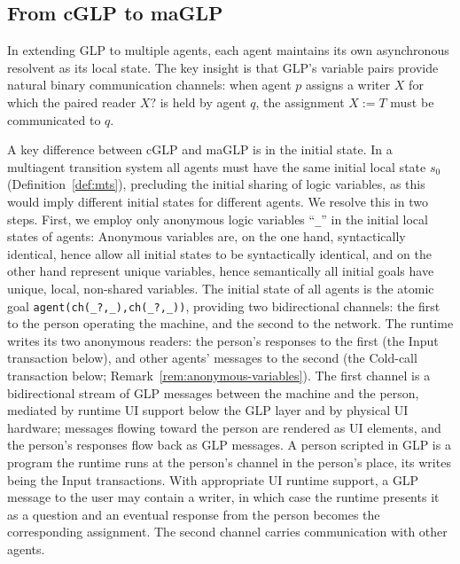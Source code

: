 \subsection{From cGLP to maGLP}
\label{sec:glp-to-maglp}\label{sec:maglp-def}

In extending GLP to multiple agents, each agent maintains its own asynchronous resolvent as its local state. The key insight is that GLP's variable pairs provide natural binary communication channels: when agent $p$ assigns a writer $X$ for which the paired reader $X?$ is held by agent $q$, the assignment $X := T$ must be communicated to $q$.

A key difference between cGLP and maGLP is in the initial state. In a multiagent transition system all agents must have the same initial local state $s_0$ (Definition~\ref{def:mts}),  precluding the initial sharing of logic variables, as this would imply different initial states for different agents.
%
We resolve this in two steps. First, we employ only anonymous logic variables ``\verb|_|'' in the initial local states of agents: Anonymous variables are, on the one hand, syntactically identical, hence allow all initial states to be syntactically identical, and on the other hand represent unique variables, hence semantically all initial goals have unique, local, non-shared variables. The initial state of all agents is the atomic goal \verb|agent(ch(_?,_),ch(_?,_))|, providing two bidirectional channels: the first to the person operating the machine, and the second to the network.  The runtime writes its two anonymous readers: the person's responses to the first (the Input transaction below), and other agents' messages to the second (the Cold-call transaction below; Remark~\ref{rem:anonymous-variables}). The first channel is a bidirectional stream of GLP messages between the machine and the person, mediated by runtime UI support below the GLP layer and by physical UI hardware; messages flowing toward the person are rendered as UI elements, and the person's responses flow back as GLP messages. A person scripted in GLP is a program the runtime runs at the person's channel in the person's place, its writes being the Input transactions. With appropriate UI runtime support, a GLP message to the user may contain a writer, in which case the runtime presents it as a question and an eventual response from the person becomes the corresponding assignment. The second channel carries communication with other agents.

